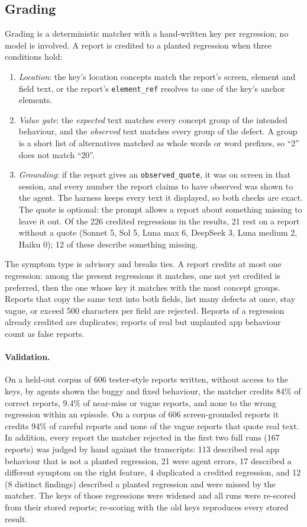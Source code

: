 \documentclass[11pt]{article}
\begin{document}
\subsection{Grading}\label{sec:grading}
Grading is a deterministic matcher with a hand-written key per regression; no model is involved.
A report is credited to a planted regression when three conditions hold:
\begin{enumerate}
  \item \emph{Location}: the key's location concepts match the report's screen, element and field
    text, or the report's \texttt{element\_ref} resolves to one of the key's anchor elements.
  \item \emph{Value gate}: the \emph{expected} text matches every concept group of the intended
    behaviour, and the \emph{observed} text matches every group of the defect. A group is a short
    list of alternatives matched as whole words or word prefixes, so ``2'' does not match ``20''.
  \item \emph{Grounding}: if the report gives an \texttt{observed\_quote}, it was on screen in
    that session, and every number the report claims to have observed was shown to the agent. The
    harness keeps every text it displayed, so both checks are exact. The quote is optional: the
    prompt allows a report about something missing to leave it out. Of the 226 credited regressions
    in the results, 21 rest on a report without a quote (Sonnet 5, Sol 5, Luna max 6, DeepSeek 3,
    Luna medium 2, Haiku 0); 12 of these describe something missing.
\end{enumerate}
The symptom type is advisory and breaks ties. A report credits at most one regression: among the
present regressions it matches, one not yet credited is preferred, then the one whose key it
matches with the most concept groups. Reports that copy the
same text into both fields, list many defects at once, stay vague, or exceed 500 characters per
field are rejected. Reports of a regression already credited are duplicates; reports of real but
unplanted app behaviour count as false reports.

\paragraph{Validation.} On a held-out corpus of 606 tester-style reports written, without access
to the keys, by agents shown the buggy and fixed behaviour, the matcher credits 84\% of correct
reports, 9.4\% of near-miss or vague reports, and none to the wrong regression within an episode.
On a corpus of 606 screen-grounded reports it credits 94\% of careful reports and none of the vague
reports that quote real text. In addition, every report the matcher rejected in the first two full
runs (167 reports) was judged by hand against the transcripts: 113 described real app behaviour
that is not a planted regression, 21 were agent errors, 17 described a different symptom on the
right feature, 4 duplicated a credited regression, and 12 (8 distinct findings) described a planted
regression and were missed by the matcher. The keys of those regressions were widened and all
runs were re-scored from their stored reports; re-scoring with the old keys reproduces every
stored result.
\end{document}
